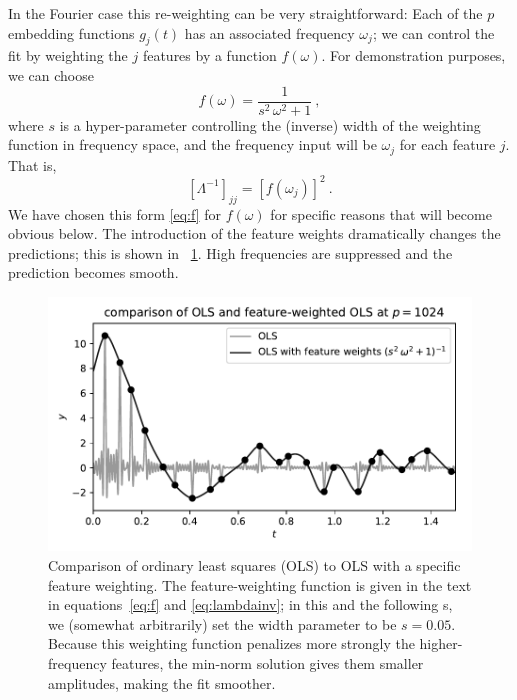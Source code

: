\documentclass[12pt,letterpaper]{article}
\newlength{\figurewidth}
\begin{document}
In the Fourier case this re-weighting can be very straightforward: Each of the $p$ embedding functions $g_j(t)$ has an associated frequency $\omega_j$; we can control the fit by weighting the $j$ features by a function $f(\omega)$.
For demonstration purposes, we can choose
\begin{equation}\label{eq:f}
    f(\omega) = \frac{1}{s^2\,\omega^2 + 1}
    ~,
\end{equation}
where $s$ is a hyper-parameter controlling the (inverse) width of the weighting function in frequency space, and the frequency input will be $\omega_j$ for each feature $j$. That is,
\begin{equation}\label{eq:lambdainv}
    [\Lambda^{-1}]_{jj} = [f(\omega_j)]^2
    ~.
\end{equation}
We have chosen this form \eqref{eq:f} for $f(\omega)$ for specific reasons that will become obvious below.
The introduction of the feature weights dramatically changes the predictions; this is shown in \figurename~\ref{fig:fwols}.
High frequencies are suppressed and the prediction becomes smooth.
\begin{figure}[t]
    \begin{mdframed}
    \includegraphics[width=\figurewidth]{paper/weighted-OLS.pdf}
    \caption{Comparison of ordinary least squares (OLS) to OLS with a specific feature weighting. The feature-weighting function is given in the text in equations~\eqref{eq:f} and \eqref{eq:lambdainv}; in this and the following \figurename s, we (somewhat arbitrarily) set the width parameter to be $s=0.05$. Because this weighting function penalizes more strongly the higher-frequency features, the min-norm solution gives them smaller amplitudes, making the fit smoother.}
    \label{fig:fwols}
    \end{mdframed}
\end{figure}
\end{document}
